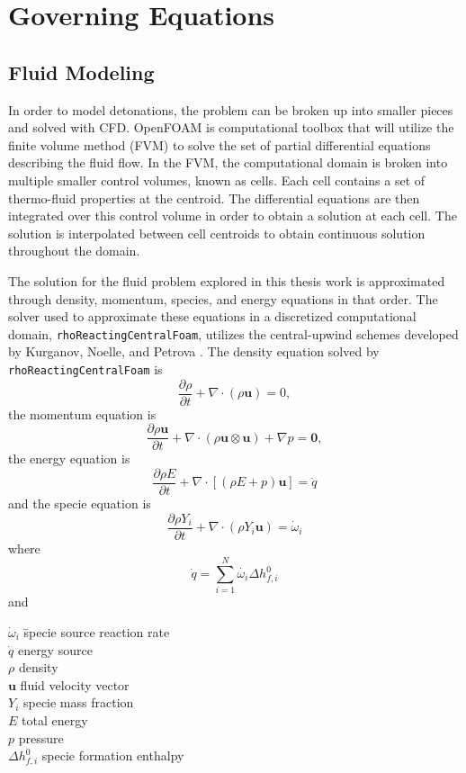 \chapter{Governing Equations}
\label{math}

\section{Fluid Modeling}
In order to model detonations, the problem can be broken up into smaller pieces and solved with CFD. OpenFOAM is computational toolbox that will utilize the finite volume method (FVM) to solve the set of partial differential equations describing the fluid flow. In the FVM, the computational domain is broken into multiple smaller control volumes, known as cells. Each cell contains a set of thermo-fluid properties at the centroid. The differential equations are then integrated over this control volume in order to obtain a solution at each cell. The solution is interpolated between cell centroids to obtain continuous solution throughout the domain. 

The solution for the fluid problem explored in this thesis work is approximated through density, momentum, species, and energy equations in that order. The solver used to approximate these equations in a discretized computational domain, \verb|rhoReactingCentralFoam|, utilizes the central-upwind schemes developed by Kurganov, Noelle, and Petrova \cite{kurganov}. The density equation solved by \verb|rhoReactingCentralFoam| is
\begin{equation}
\frac{\partial \rho}{\partial t} + \nabla \cdot \left(\rho \bm{u}\right) = 0,
\end{equation}
the momentum equation is
\begin{equation}
\frac{\partial \rho\bm{u}}{\partial t} + \nabla \cdot \left(\rho \bm{u}\otimes \bm{u}\right) + \nabla p = \bm{0}, 
\end{equation}
the energy equation is
\begin{equation}
\frac{\partial \rho E}{\partial t} + \nabla \cdot \left[\left(\rho E + p\right)\bm{u}\right] = \dot{q}
\end{equation}
and the specie equation is
\begin{equation}
\frac{\partial \rho Y_i}{\partial t} + \nabla \cdot \left(\rho Y_i \bm{u}\right) = \dot{\omega}_i
\end{equation}
where 
\begin{equation}
\dot{q} = \sum_{i = 1}^N \dot{\omega_i} \Delta h_{f,i}^0
\end{equation}
and
\begin{tabbing}
\qquad \= \(\dot{\omega}_i\) \qquad \= specie source reaction rate \\ 
\> \(\dot{q}\) \> energy source \\
\> \(\rho\) \> density \\
\> \(\bm{u}\) \> fluid velocity vector \\
\> \(Y_i\) \> specie mass fraction \\
\> \(E\) \> total energy \\
\> \(p\) \> pressure\\
\> \(\Delta h_{f,i}^0\) \> specie formation enthalpy
\end{tabbing}

